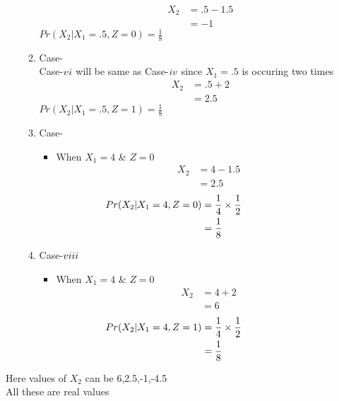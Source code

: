 \documentclass[11pt,a4paper,twocolumn]{article}
\begin{document}
\begin{enumerate}
\begin{enumerate}
    \begin{align*}
         X_2&=.5-1.5\\
         &=-1
    \end{align*}
    $Pr(X_{2}|X_{1}=.5,Z=0)=\frac{1}{8}$\\
     \item Case-\\
    Case-$\romannumeral6$ will be same as Case-$\romannumeral4$ since $X_{1}=.5$ is occuring two times\\
    \begin{align*}
         X_2&=.5+2\\
         &=2.5
    \end{align*}
    $Pr(X_{2}|X_{1}=.5,Z=1)=\frac{1}{8}$\\
    \item Case-
    \begin{itemize}
        \item When $X_{1}=4$ \& $Z=0$
    \begin{align*}
        X_{2}&=4-1.5\\
        &=2.5
    \end{align*}
    \begin{align*}
        \hspace{-2.5cm}
        Pr(X_{2}|X_{1}=4,Z=0)&=\frac{1}{4}\times\frac{1}{2}\\
        &=\frac{1}{8}
    \end{align*}
    \end{itemize}
\newpage
     \item {Case-$\romannumeral8$}
     \begin{itemize}
         \item When $X_{1}=4$ \& $Z=0$
    \begin{align*}
        X_{2}&=4+2\\
        &=6
    \end{align*}
    \begin{align*}
        \hspace{-2.5cm}
        Pr(X_{2}|X_{1}=4,Z=1)&=\frac{1}{4}\times\frac{1}{2}\\
        &=\frac{1}{8}
    \end{align*}
    \end{itemize}
    \end{enumerate}
\end{enumerate}
Here values of $X_{2}$ can be 6,2.5,-1,-4.5\\
All these are real values\\
\end{document}
